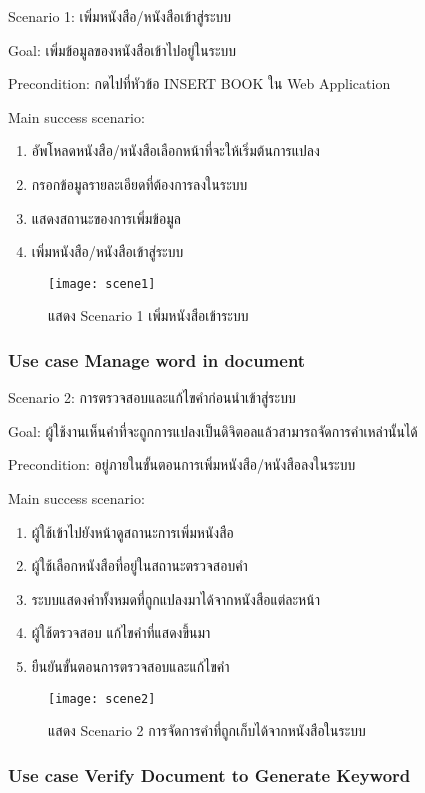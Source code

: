 Scenario 1: เพิ่มหนังสือ/หนังสือเข้าสู่ระบบ

Goal: เพิ่มข้อมูลของหนังสือเข้าไปอยู่ในระบบ

Precondition: กดไปที่หัวข้อ INSERT BOOK ใน Web Application 

Main success scenario:

\begin{enumerate}
    \item อัพโหลดหนังสือ/หนังสือเลือกหน้าที่จะให้เริ่มต้นการแปลง
    \item กรอกข้อมูลรายละเอียดที่ต้องการลงในระบบ
    \item แสดงสถานะของการเพิ่มข้อมูล
    \item เพิ่มหนังสือ/หนังสือเข้าสู่ระบบ
\end{enumerate}

\begin{figure}[H]
    \centering
    \texttt{[image: scene1]}
    \caption{แสดง Scenario 1 เพิ่มหนังสือเข้าระบบ}\label{fig:scene1}
\end{figure}

\subsubsection{Use case Manage word in document}

Scenario 2: การตรวจสอบและแก้ไขคำก่อนนำเข้าสู่ระบบ

Goal: ผู้ใช้งานเห็นคำที่จะถูกการแปลงเป็นดิจิตอลแล้วสามารถจัดการคำเหล่านั้นได้

Precondition: อยู่ภายในขั้นตอนการเพิ่มหนังสือ/หนังสือลงในระบบ

Main success scenario:

\begin{enumerate}
    \item ผู้ใช้เข้าไปยังหน้าดูสถานะการเพิ่มหนังสือ
    \item ผู้ใช้เลือกหนังสือที่อยู่ในสถานะตรวจสอบคำ
    \item ระบบแสดงคำทั้งหมดที่ถูกแปลงมาได้จากหนังสือแต่ละหน้า
    \item ผู้ใช้ตรวจสอบ แก้ไขคำที่แสดงขึ้นมา
    \item ยืนยันขั้นตอนการตรวจสอบและแก้ไขคำ
\end{enumerate}
\begin{figure}[H]
    \centering
    \texttt{[image: scene2]}
    \caption{แสดง Scenario 2 การจัดการคำที่ถูกเก็บได้จากหนังสือในระบบ}\label{fig:scene2}
\end{figure}

\subsubsection{Use case Verify Document to Generate Keyword}

